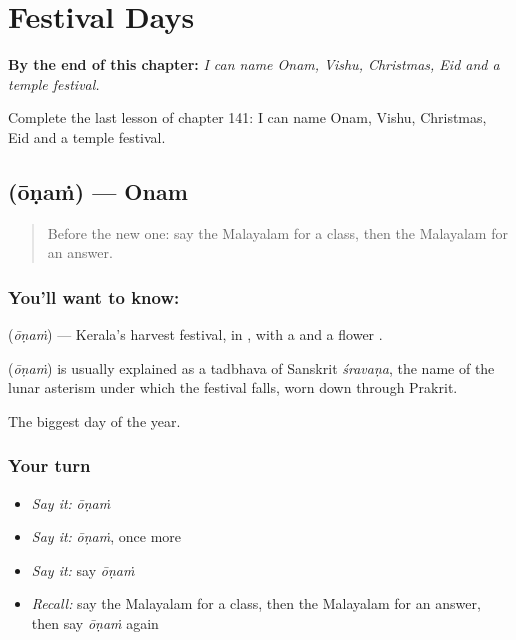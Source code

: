 
\chapter{Festival Days}
\label{ch:ml-festival-days}

\begin{chapteropening}
\textbf{By the end of this chapter:} \emph{I can name Onam, Vishu, Christmas, Eid and a temple festival.}

Complete the last lesson of chapter 141: I can name Onam, Vishu, Christmas, Eid and a temple festival.
\end{chapteropening}

\section[\texorpdfstring{\ml{ഓണം} (ōṇaṁ)}{ഓണം (ōṇaṁ)}]{ (ōṇaṁ) — Onam}

\label{lesson:ML-C141-onam}



\begin{quote}
Before the new one: say the Malayalam for a class, then the Malayalam for an answer.
\end{quote}

\subsection*{You'll want to know: }
\textbf{} (\emph{ōṇaṁ}) — Kerala's harvest festival, in \textbf{}, with a \textbf{} and a flower \textbf{}.

\begin{cousinweb}
\textbf{} (\emph{ōṇaṁ}) is usually explained as a tadbhava of Sanskrit \emph{śravaṇa}, the name of the lunar asterism under which the festival falls, worn down through Prakrit.
\end{cousinweb}

\begin{grammarlens}[title={What you've built}]
The biggest day of the year.
\end{grammarlens}

\subsection*{Your turn}
\begin{itemize}
\raggedright
  \item \emph{Say it:} \emph{ōṇaṁ}
  \item \emph{Say it:} \emph{ōṇaṁ}, once more
  \item \emph{Say it:} say \emph{ōṇaṁ}
  \item \emph{Recall:} say the Malayalam for a class, then the Malayalam for an answer, then say \emph{ōṇaṁ} again
\end{itemize}

